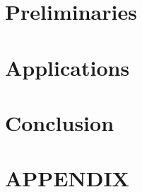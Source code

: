 \documentclass[12pt,titlepage]{article}
\begin{document}
\section{Preliminaries}
\label{sec:preliminaries}



\section{Applications}
\label{sec:results}


%

\section{Conclusion}
\label{sec:conclusion}




	\singlespacing
	 \nocite{*}
	
	

\clearpage
\appendix
\section*{APPENDIX}
\setcounter{section}{1}
\label{sec:appendix}

\end{document}
